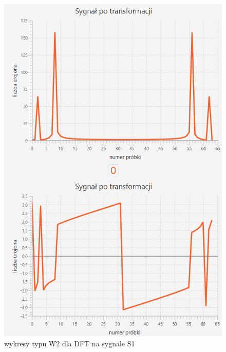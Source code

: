 \documentclass[12pt]{article}
\begin{document}
\begin{figure}[H]
	\centering
	\includegraphics[width=\linewidth]{S1_DFT_W2.png}
	\caption{wykresy typu W2 dla DFT na sygnale S1}
	\label{S1_DFT_W2}
\end{figure}
\end{document}
